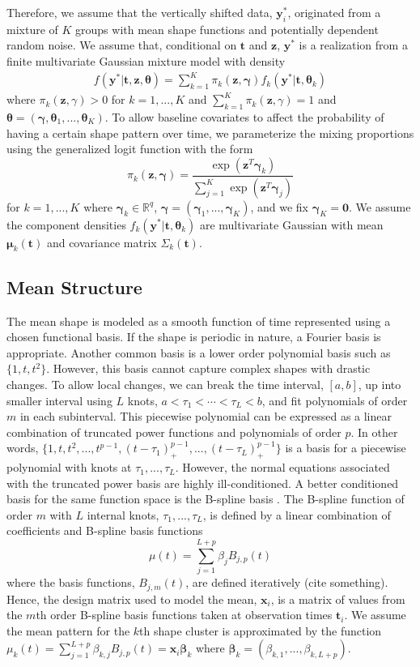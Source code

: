 \documentclass[12pt]{article}
\newcommand{\B}[0]{\mathbf}
\newcommand{\bs}[0]{\boldsymbol}
\begin{document}
Therefore, we assume that the vertically shifted data, $\B y_{i}^{*}$, originated from a mixture of $K$ groups with mean shape functions and potentially dependent random noise. We assume that, conditional on $\B t$ and $\B z$, $\B y^{*}$ is a realization from a finite multivariate Gaussian mixture model with density
\begin{align*}
 f(\B y^{*}|\B t,\B z,\bs\theta) =  \sum^{K}_{k=1}\pi_{k}(\B z, \bs\gamma)f_{k}( \B y^{*}|\B t,\bs\theta_{k})\label{mixmodel}
\end{align*}
where $\pi_{k}(\B z,\gamma)>0$ for $k=1,...,K$ and $\sum^{K}_{k=1}\pi_{k}(\B z,\gamma)=1$ and $\bs\theta = (\bs\gamma,\bs\theta_{1},...,\bs\theta_{K})$. To allow baseline covariates to affect the probability of having a certain shape pattern over time, we parameterize the mixing proportions using the generalized logit function with the form
$$\pi_{k}(\B z,\bs\gamma)=\frac{\exp(\B z^{T}\bs\gamma_{k})}{\sum_{j=1}^{K}\exp(\B z^{T}\bs\gamma_{j})}$$ 
for $k=1,...,K$ where $\bs \gamma_{k}\in\mathbb{R}^{q}$, $\bs\gamma = (\bs\gamma_{1},...,\bs\gamma_{K})$, and we fix $\bs\gamma_{K}=\B 0$. We assume the component densities $f_{k}(\B y^{*}|\B t,\bs\theta_{k})$ are multivariate Gaussian with mean $\bs\mu_{k}(\B t)$ and covariance matrix $\Sigma_{k}(\B t)$.

\subsection{Mean Structure}
The mean shape is modeled as a smooth function of time represented using a chosen functional basis. If the shape is periodic in nature, a Fourier basis is appropriate. Another common basis is a lower order polynomial basis such as $\{1, t, t^{2}\}$. However, this basis cannot capture complex shapes with drastic changes. To allow local changes, we can break the time interval, $[a,b]$, up into smaller interval using $L$ knots, $a<\tau_{1}<\cdots<\tau_{L}<b$, and fit polynomials of order $m$ in each subinterval. This piecewise polynomial can be expressed as a linear combination of truncated power functions and polynomials of order $p$. In other words,
$\{1,t,t^{2},...,t^{p-1},(t-\tau_{1})_{+}^{p-1},...,(t-\tau_{L})_{+}^{p-1}\}$
is a basis for a piecewise polynomial with knots at $\tau_{1},...,\tau_{L}$. However, the normal equations associated with the truncated power basis are highly ill-conditioned. A better conditioned basis for the same function space is the B-spline basis \cite{deboor1978, schumaker1981,curry1966, de1976}. The B-spline function of order $m$ with $L$ internal knots, $\tau_{1},...,\tau_{L}$, is defined by a linear combination of coefficients and B-spline basis functions
$$\mu(t) = \sum^{L+p}_{j=1} \beta_j B_{j,p}(t)$$
where the basis functions, $B_{j,m}(t)$, are defined iteratively (cite something). Hence, the design matrix used to model the mean, $\B x_{i}$, is a matrix of values from the $m$th order B-spline basis functions taken at observation times $\B t_{i}$. We assume the mean pattern for the $k$th shape cluster is approximated by the function $\mu_{k}(t)=\sum^{L+p}_{j=1} \beta_{k,j} B_{j,p}(t) = \B x_{i}\bs\beta_{k}$ where $\bs\beta_{k}=(\beta_{k,1},...,\beta_{k, L+p}).$  
\end{document}
